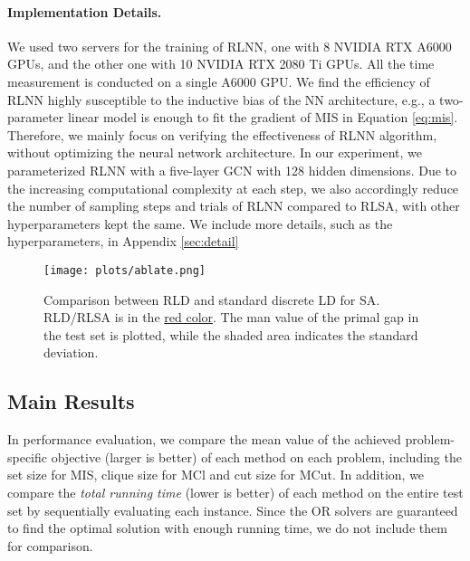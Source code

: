 \paragraph{Implementation Details.} We used two servers for the training of RLNN, one with 8 NVIDIA RTX A6000 GPUs, and the other one with 10 NVIDIA RTX 2080 Ti GPUs. All the time measurement is conducted on a single A6000 GPU. We find the efficiency of RLNN highly susceptible to the inductive bias of the NN architecture, e.g., a two-parameter linear model is enough to fit the gradient of MIS in Equation \ref{eq:mis}. Therefore, we mainly focus on verifying the effectiveness of RLNN algorithm, without optimizing the neural network architecture. In our experiment, we parameterized RLNN with a five-layer GCN \citep{kipf2017semisupervised} with 128 hidden dimensions. Due to the increasing computational complexity at each step, we also accordingly reduce the number of sampling steps and trials of RLNN compared to RLSA, with other hyperparameters kept the same. We include more details, such as the hyperparameters, in Appendix \ref{sec:detail}
\begin{figure*}[ht!]
    \centering
    \texttt{[image: plots/ablate.png]}
    \caption{Comparison between RLD and standard discrete LD for SA. RLD/RLSA is in the \underline{red color}. The man value of the primal gap in the test set is plotted, while the shaded area indicates the standard deviation.}
    \label{fig:ablation}
\end{figure*}


\subsection{Main Results}
In performance evaluation, we compare the mean value of the achieved problem-specific objective (larger is better) of each method on each problem, including the set size for MIS, clique size for MCl and cut size for MCut. In addition, we compare the \textit{total running time} (lower is better) of each method on the entire test set by sequentially evaluating each instance. Since the OR solvers are guaranteed to find the optimal solution with enough running time, we do not include them for comparison.

